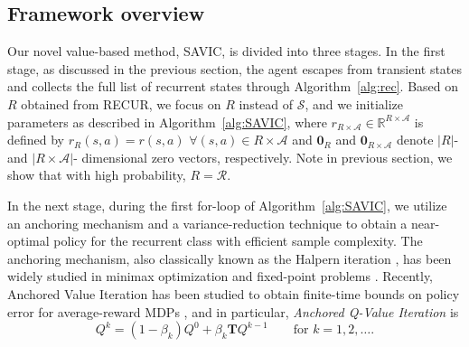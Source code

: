 \documentclass{article}
\theoremstyle{definition}
\theoremstyle{remark}
\newcommand{\real}{\mathbb{R}}
\newcommand{\cA}{\mathcal{A}}
\newcommand{\cS}{\mathcal{S}}
\newcommand{\cR}{\mathcal{R}}
\newcommand{\T}{\mathbf{T}}
\begin{document}
\subsection{Framework overview}
Our novel value-based method, SAVIC, is divided into three stages. In the first stage, as discussed in the previous section, the agent escapes from transient states and collects the full list of recurrent states through Algorithm~\ref{alg:rec}. Based on $R$ obtained from RECUR, we focus on $R$ instead of $\cS$, and we initialize parameters as described in Algorithm~\ref{alg:SAVIC}, where $r_{R\times \cA} \in \real^{R\times \cA} $ is defined by $r_R(s,a)=r(s,a)$  $\forall (s,a)\in R \times \cA$ and $\mathbf{0}_R$ and $\mathbf{0}_{R\times \cA}$ denote $|R|$- and $|R\times\cA|$- dimensional zero vectors, respectively. Note in previous section, we show that with high probability, $R=\cR$.  

In the next stage,  during the first for-loop of Algorithm~\ref{alg:SAVIC}, we utilize an anchoring mechanism and a variance-reduction technique to obtain a near-optimal policy for the recurrent class with efficient sample complexity. The anchoring mechanism, also classically known as the Halpern iteration \cite{halpern1967fixed}, has been widely studied in minimax optimization and fixed-point problems \cite{sabach2017first, Lieder2021halpern,yoon2021accelerated,park2022exact, bravo2026minimax}. Recently, Anchored Value Iteration  has been studied to obtain finite-time bounds on policy error for average-reward MDPs \cite{bravostochastic,lee2025multi,lee2025near,lee2025finite, zurek2025faster}, and in particular, \emph{Anchored Q-Value Iteration} is
\[
Q^{k} = (1-\beta_k) Q^0+\beta_k \T Q^{k-1} \qquad\text{for } k=1,2,\dots. \tag{Anc-QI}
\]
\end{document}
